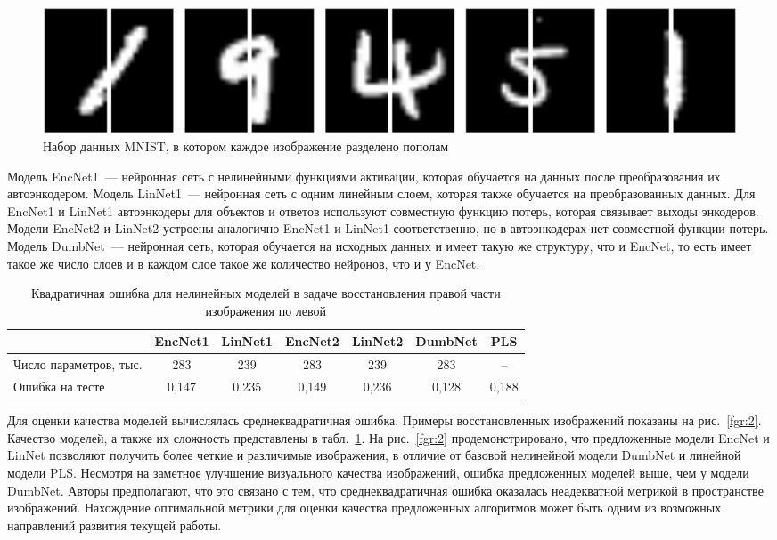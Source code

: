 \begin{figure}[!tp]
\centering \includegraphics[width=\linewidth]{figs/ch2/left_right_mnist}
\caption{Набор данных MNIST, в котором каждое изображение разделено пополам}
\label{fgr:3}
\end{figure}

Модель EncNet1~--- нейронная сеть с нелинейными функциями активации, которая обучается на данных после преобразования их автоэнкодером. Модель LinNet1~--- нейронная сеть с одним линейным слоем, которая также обучается на преобразованных данных. Для EncNet1 и LinNet1 автоэнкодеры для объектов и ответов используют совместную функцию потерь, которая связывает выходы энкодеров. Модели EncNet2 и LinNet2 устроены аналогично EncNet1 и LinNet1 соответственно, но в автоэнкодерах нет совместной функции потерь. Модель DumbNet~---  нейронная сеть, которая обучается на исходных данных и имеет такую же структуру, что и EncNet, то есть имеет такое же число слоев и в каждом слое такое же количество нейронов, что и у EncNet.

\begin{table}[!bp]
\caption{Квадратичная ошибка для нелинейных моделей в задаче восстановления правой части изображения по левой}
\centering
\begin{tabular}{l|cccccc}
\hline
	& EncNet1 & LinNet1 & EncNet2 & LinNet2 & DumbNet & PLS\\  \hline
	Число параметров, тыс. & 283 & 239 & 283 & 239  & 283 & --\\
	Ошибка на тесте & 0,147 & 0,235 & 0,149 & 0,236 & 0,128 & 0,188 \\
	\hline
\end{tabular}
\label{tbl:2}
\end{table}

Для оценки качества моделей вычислялась среднеквадратичная ошибка. Примеры восстановленных изображений показаны на рис.~\ref{fgr:2}. Качество моделей, а также их сложность представлены в табл.~\ref{tbl:2}.
На рис.~\ref{fgr:2} продемонстрировано, что предложенные модели EncNet и LinNet позволяют получить более четкие и различимые изображения, в отличие от базовой нелинейной модели DumbNet и линейной модели PLS.
Несмотря на заметное улучшение визуального качества изображений, ошибка предложенных моделей выше, чем у модели DumbNet.
Авторы предполагают, что это связано с тем, что среднеквадратичная ошибка оказалась неадекватной метрикой в пространстве изображений.
Нахождение оптимальной метрики для оценки качества предложенных алгоритмов может быть одним из возможных направлений развития текущей работы.

